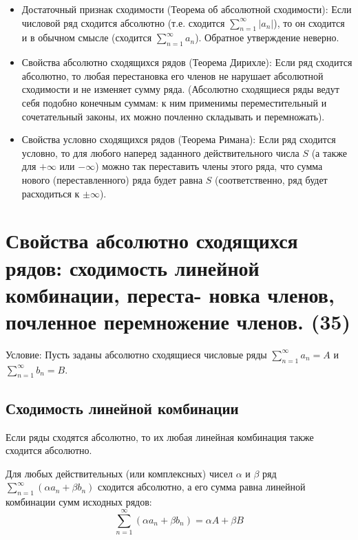 \documentclass[14pt]{extreport}
\begin{document}
    \begin{theorem}
        \begin{itemize}
            \item Достаточный признак сходимости (Теорема об абсолютной сходимости):
Если числовой ряд сходится абсолютно (т.е. сходится $\sum_{n=1}^{\infty} |a_n|$), то он сходится и в обычном смысле (сходится $\sum_{n=1}^{\infty} a_n$).
Обратное утверждение неверно.
            \item Свойства абсолютно сходящихся рядов (Теорема Дирихле):
Если ряд сходится абсолютно, то любая перестановка его членов не нарушает абсолютной сходимости и не изменяет сумму ряда.
(Абсолютно сходящиеся ряды ведут себя подобно конечным суммам: к ним применимы переместительный и сочетательный законы, их можно почленно складывать и перемножать).
            \item Свойства условно сходящихся рядов (Теорема Римана):
Если ряд сходится условно, то для любого наперед заданного действительного числа $S$ (а также для $+\infty$ или $-\infty$) можно так переставить члены этого ряда, что сумма нового (переставленного) ряда будет равна $S$ (соответственно, ряд будет расходиться к $\pm\infty$).
        \end{itemize}
    \end{theorem}

    \chapter{Свойства абсолютно сходящихся рядов: сходимость линейной комбинации, переста-
новка членов, почленное перемножение членов. (35)}

    Условие: Пусть заданы абсолютно сходящиеся числовые ряды $\sum_{n=1}^{\infty} a_n = A$ и $\sum_{n=1}^{\infty} b_n = B$.

    \section{Сходимость линейной комбинации}

    Если ряды сходятся абсолютно, то их любая линейная комбинация также сходится абсолютно.

    \begin{theorem}
        Для любых действительных (или комплексных) чисел $\alpha$ и $\beta$ ряд $\sum_{n=1}^{\infty} (\alpha a_n + \beta b_n)$ сходится абсолютно, а его сумма равна линейной комбинации сумм исходных рядов:$$\sum_{n=1}^{\infty} (\alpha a_n + \beta b_n) = \alpha A + \beta B$$

    \end{theorem}
\end{document}
